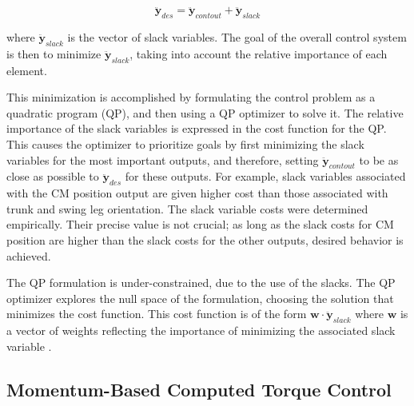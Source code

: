 \documentclass{llncs}
\begin{document}
\begin{equation}
\ddot{\mathbf{y}}_{des} = \ddot{\mathbf{y}}_{contout} + \ddot{\mathbf{y}}_{slack}
\label{eq:y_contout}
\end{equation}

\noindent where $\ddot{\mathbf{y}}_{slack}$ is the vector of slack variables.  
The goal of the overall control system is then to minimize $\ddot{\mathbf{y}}_{slack}$, taking into account the relative importance of each element.  

This minimization is accomplished by formulating the control problem as a quadratic program (QP), and then using a QP optimizer to solve it.  
The relative importance of the slack variables is expressed in the cost function for the QP.
This causes the optimizer to prioritize goals by first minimizing the slack variables for the most important outputs, and therefore, setting
$\ddot{\mathbf{y}}_{contout}$ to be as close as possible to $\ddot{\mathbf{y}}_{des}$ for these outputs.  
For example, slack variables associated with the CM position output are given higher cost than those associated with trunk and swing leg orientation.  
The slack variable costs were determined empirically.  
Their precise value is not crucial;  as long as the slack costs for CM position are higher than the slack costs for the other outputs, desired behavior is achieved.

The QP formulation is under-constrained, due to the use of the slacks.  
The QP optimizer explores the null space of the formulation, choosing the solution that minimizes the cost function.  
This cost function is of the form $\mathbf{w} \cdot \ddot{\mathbf{y}}_{slack}$ where $\mathbf{w}$ 
is a vector of weights reflecting the importance of minimizing the associated slack variable \cite{hofmann2004sliding}. 






\subsection{Momentum-Based Computed Torque Control }
\label{sec:framework}
\end{document}
